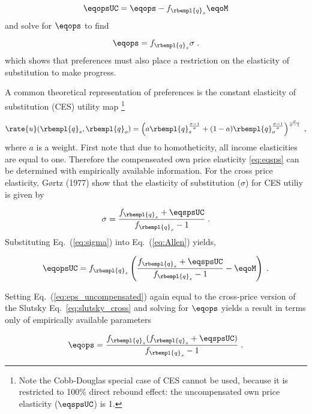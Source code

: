 \begin{equation} \label{eq:slutsky_cross}
  \eqopsUC = \eqops - f_{\rbempl{q}_s} \eqoM
\end{equation}
%
and solve for $\eqops$ to find

\begin{equation} \label{eq:eqops_general}
  \eqops = f_{\rbempl{q}_s} \sigma \; .
\end{equation}
which shows that preferences must also place a restriction on the elasticity of substitution to make progress.

A common theoretical representation of preferences is
the constant elasticity of substitution (CES)
utility map \citep{Lemoine:2020aa}%
\footnote{
  Note the Cobb-Douglas special case of CES cannot be used, because
  it is restricted to 100\% direct rebound effect: 
  the uncompensated own price elasticity ($\eqspsUC$) is 1.
}

\begin{equation}
  \rate{u}(\rbempl{q}_s,\rbempl{q}_o) = 
      \left( a \rbempl{q}_s^{\frac{\sigma-1}{\sigma}} + (1-a) \rbempl{q}_o^{\frac{\sigma-1}{\sigma}}\right)                ^{\frac{\sigma}{\sigma-1}} \; ,
\end{equation}
%
where $a$ is a weight. First note that due to homotheticity,
all income elasticities are equal to one. Therefore
the compenseated own price elasticity \ref{eq:eqsps} can be 
determined with empirically available information.
For the cross price elasticity, G{\o}rtz (1977) show that
the elasticity of substitution ($\sigma$) 
for CES utiliy is given by

\begin{equation} \label{eq:sigma}
  \sigma  = \frac{f_{\rbempl{q}_s} + \eqspsUC}{f_{\rbempl{q}_s} -1 } \; .
\end{equation}
%
Substituting Eq.~(\ref{eq:sigma}) into Eq.~(\ref{eq:Allen}) yields, 

\begin{equation} \label{eq:eps_uncompensated}
  \eqopsUC = f_{\rbempl{q}_s} \left( \frac{f_{\rbempl{q}_s} + \eqspsUC}{f_{\rbempl{q}_s} -1 } - \eqoM \right) \; .
\end{equation}

Setting Eq.~(\ref{eq:eps_uncompensated}) again equal to 
the cross-price version of the Slutsky Eq.~\ref{eq:slutsky_cross}
and solving for $\eqops$ yields a result in terms only
of empirically available parameters

\begin{equation} \label{eq:eqops}
  \eqops = \frac{f_{\rbempl{q}_s} (f_{\rbempl{q}_s} + \eqspsUC)}{f_{\rbempl{q}_s}-1} \; .
\end{equation}

